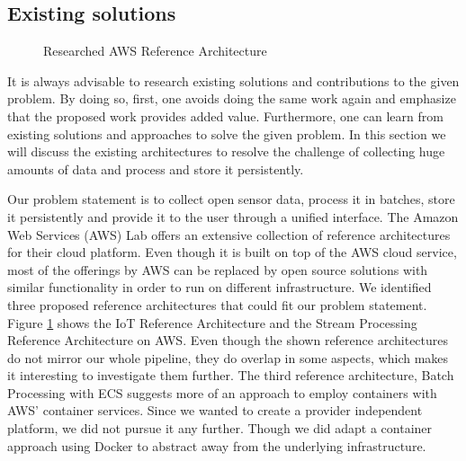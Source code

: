 \subsection{Existing solutions}\label{existing-solutions}

\begin{figure}%
	\centering
	\caption{Researched AWS Reference Architecture}%
	\label{fig:aws-refarch}%
\end{figure}

It is always advisable to research existing solutions and contributions
to the given problem. By doing so, first, one avoids doing the same work again
and emphasize that the proposed work provides added value. Furthermore,
one can learn from existing solutions and approaches to solve the given problem.
In this section we will discuss the existing architectures to resolve the
challenge of collecting huge amounts of data and process and store it persistently.

Our problem statement is to collect open sensor data, process it in batches,
store it persistently and provide it to the user through a unified interface.
The Amazon Web Services (AWS) Lab offers an extensive collection of reference
architectures for their cloud platform. Even though it is built on top of
the AWS cloud service, most of the offerings by AWS can be replaced by open
source solutions with similar functionality in order to run on different
infrastructure. We identified three proposed reference architectures that could
fit our problem statement. Figure \ref{fig:aws-refarch} shows the IoT Reference
Architecture and the Stream Processing Reference Architecture on AWS. Even
though the shown reference architectures do not mirror our whole pipeline,
they do overlap in some aspects, which makes it interesting to investigate them
further. The third reference architecture, Batch Processing with ECS suggests
more of an approach to employ containers with AWS' container services.
Since we wanted to create a provider independent platform, we did not pursue it
any further. Though we did adapt a container approach using Docker to abstract
away from the underlying infrastructure.

